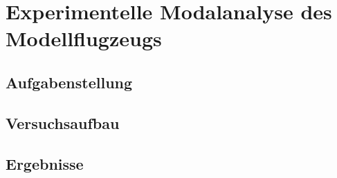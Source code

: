 \chapter{Experimentelle Modalanalyse des Modellflugzeugs}
\label{sec: Hauptkapitel 1}

\section{Aufgabenstellung}

\section{Versuchsaufbau}

\section{Ergebnisse}
